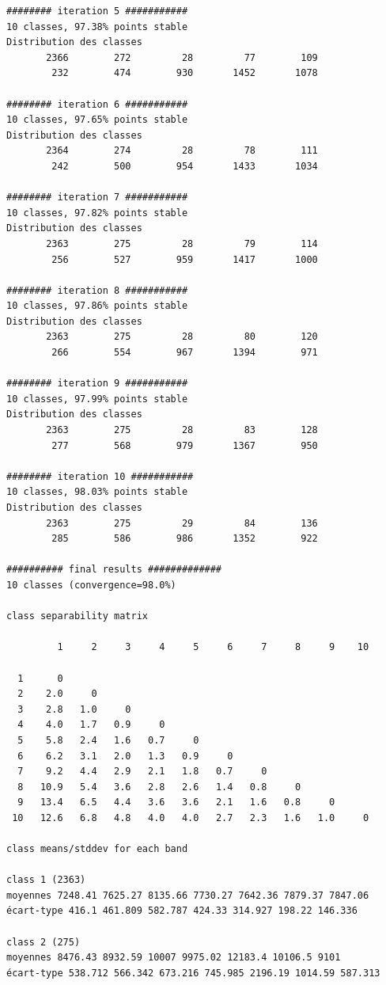 \documentclass[earth,article,submit,pdftex,moreauthors]{Definitions/mdpi}
\begin{document}
\begin{scriptsize}
\begin{verbatim}
######## iteration 5 ###########
10 classes, 97.38% points stable
Distribution des classes
       2366        272         28         77        109
        232        474        930       1452       1078

######## iteration 6 ###########
10 classes, 97.65% points stable
Distribution des classes
       2364        274         28         78        111
        242        500        954       1433       1034

######## iteration 7 ###########
10 classes, 97.82% points stable
Distribution des classes
       2363        275         28         79        114
        256        527        959       1417       1000

######## iteration 8 ###########
10 classes, 97.86% points stable
Distribution des classes
       2363        275         28         80        120
        266        554        967       1394        971

######## iteration 9 ###########
10 classes, 97.99% points stable
Distribution des classes
       2363        275         28         83        128
        277        568        979       1367        950

######## iteration 10 ###########
10 classes, 98.03% points stable
Distribution des classes
       2363        275         29         84        136
        285        586        986       1352        922

########## final results #############
10 classes (convergence=98.0%)

class separability matrix

         1     2     3     4     5     6     7     8     9    10

  1      0
  2    2.0     0
  3    2.8   1.0     0
  4    4.0   1.7   0.9     0
  5    5.8   2.4   1.6   0.7     0
  6    6.2   3.1   2.0   1.3   0.9     0
  7    9.2   4.4   2.9   2.1   1.8   0.7     0
  8   10.9   5.4   3.6   2.8   2.6   1.4   0.8     0
  9   13.4   6.5   4.4   3.6   3.6   2.1   1.6   0.8     0
 10   12.6   6.8   4.8   4.0   4.0   2.7   2.3   1.6   1.0     0

class means/stddev for each band

class 1 (2363)
moyennes 7248.41 7625.27 8135.66 7730.27 7642.36 7879.37 7847.06
écart-type 416.1 461.809 582.787 424.33 314.927 198.22 146.336

class 2 (275)
moyennes 8476.43 8932.59 10007 9975.02 12183.4 10106.5 9101
écart-type 538.712 566.342 673.216 745.985 2196.19 1014.59 587.313


\end{verbatim}
\end{scriptsize}
\end{document}
